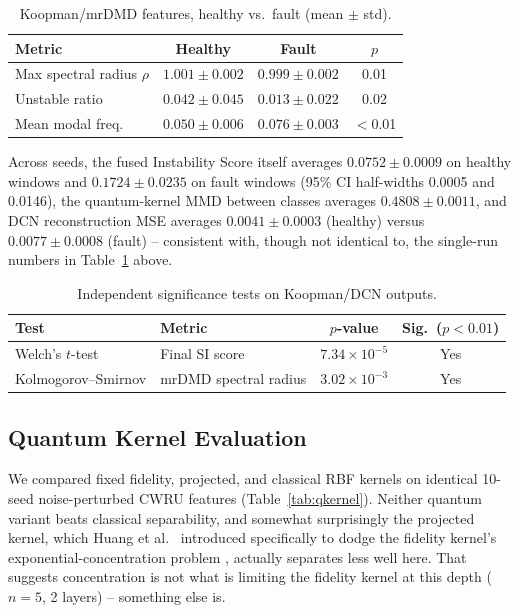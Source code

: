 \documentclass[3p,times,procedia]{elsarticle}
\begin{document}
\begin{table}[ht]
\caption{Koopman/mrDMD features, healthy vs.\ fault (mean $\pm$ std).}
\label{tab:koopman}
\centering
\begin{tabular}{lccc}
\toprule
\textbf{Metric} & \textbf{Healthy} & \textbf{Fault} & \textbf{$p$} \\
\midrule
Max spectral radius $\rho$ & $1.001 \pm 0.002$ & $0.999 \pm 0.002$ & 0.01 \\
Unstable ratio & $0.042 \pm 0.045$ & $0.013 \pm 0.022$ & 0.02 \\
Mean modal freq. & $0.050 \pm 0.006$ & $0.076 \pm 0.003$ & $<$0.01 \\
\bottomrule
\end{tabular}
\end{table}

Across seeds, the fused Instability Score itself averages $0.0752 \pm 0.0009$ on healthy windows and $0.1724 \pm 0.0235$ on fault windows (95\% CI half-widths 0.0005 and 0.0146), the quantum-kernel MMD between classes averages $0.4808 \pm 0.0011$, and DCN reconstruction MSE averages $0.0041 \pm 0.0003$ (healthy) versus $0.0077 \pm 0.0008$ (fault) -- consistent with, though not identical to, the single-run numbers in Table~\ref{tab:koopman} above.

\begin{table}[ht]
\caption{Independent significance tests on Koopman/DCN outputs.}
\label{tab:significance}
\centering
\begin{tabular}{llcc}
\toprule
\textbf{Test} & \textbf{Metric} & \textbf{$p$-value} & \textbf{Sig.\ ($p < 0.01$)} \\
\midrule
Welch's $t$-test & Final SI score & $7.34 \times 10^{-5}$ & Yes \\
Kolmogorov--Smirnov & mrDMD spectral radius & $3.02 \times 10^{-3}$ & Yes \\
\bottomrule
\end{tabular}
\end{table}

\subsection{Quantum Kernel Evaluation}

We compared fixed fidelity, projected, and classical RBF kernels on identical 10-seed noise-perturbed CWRU features (Table~\ref{tab:qkernel}). Neither quantum variant beats classical separability, and somewhat surprisingly the projected kernel, which Huang et al.\ \cite{huang2021} introduced specifically to dodge the fidelity kernel's exponential-concentration problem \cite{thanasilp2024}, actually separates less well here. That suggests concentration is not what is limiting the fidelity kernel at this depth ($n{=}5$, 2 layers) -- something else is.
\end{document}
